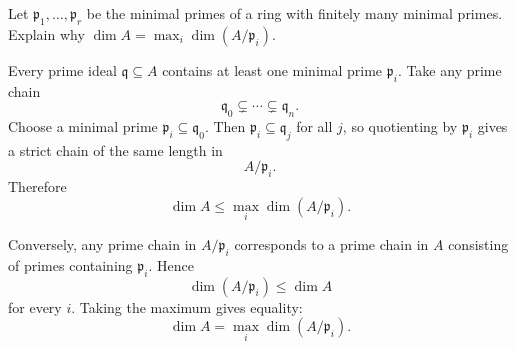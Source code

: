\begin{problem}\label{prob:vi29-17}
Let \(\mathfrak p_1,\ldots,\mathfrak p_r\) be the minimal primes of a ring with finitely many minimal primes. Explain why \(\dim A=\max_i\dim(A/\mathfrak p_i)\).

\end{problem}

\ifdefined\FullProblemDossiers
\begin{solution}
Every prime ideal \(\mathfrak q\subseteq A\) contains at least one minimal prime \(\mathfrak p_i\).  Take any
prime chain
\[
\mathfrak q_0\subsetneq\cdots\subsetneq\mathfrak q_n.
\]
Choose a minimal prime \(\mathfrak p_i\subseteq\mathfrak q_0\).  Then \(\mathfrak p_i\subseteq\mathfrak q_j\) for
all \(j\), so quotienting by \(\mathfrak p_i\) gives a strict chain of the same length in
\[
A/\mathfrak p_i.
\]
Therefore
\[
\dim A\le\max_i\dim(A/\mathfrak p_i).
\]

Conversely, any prime chain in \(A/\mathfrak p_i\) corresponds to a prime chain in \(A\) consisting of primes
containing \(\mathfrak p_i\).  Hence
\[
\dim(A/\mathfrak p_i)\le\dim A
\]
for every \(i\).  Taking the maximum gives equality:
\[
\boxed{\dim A=\max_i\dim(A/\mathfrak p_i)}.
\]
\end{solution}
\fi
